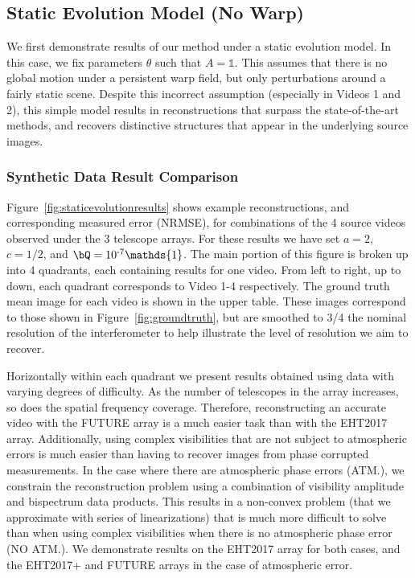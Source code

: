 \subsection{Static Evolution Model (No Warp)}
\label{sec:nomotionresults}

We first demonstrate results of our method under a static evolution model. In this case, we fix parameters $\theta$ such that $A=\mathds{1}$. This assumes that there is no global motion under a persistent warp field, but only perturbations around a fairly static scene. Despite this incorrect assumption (especially in Videos 1 and 2), this simple model results in reconstructions that surpass the state-of-the-art methods, and recovers distinctive structures that appear in the underlying source images. 


\subsubsection{Synthetic Data Result Comparison}



Figure~\ref{fig:staticevolutionresults} shows example reconstructions, and corresponding measured error (NRMSE), for combinations of the 4 source videos observed under the 3 telescope arrays. For these results we have set $a=2$, $c=1/2$, and $\bQ = 10^{\text{-}7} \mathds{1}$. The main portion of this figure is broken up into 4 quadrants, each containing results for one video. From left to right, up to down, each quadrant corresponds to Video 1-4 respectively. The ground truth mean image for each video is shown in the upper table. These images correspond to those shown in Figure~\ref{fig:groundtruth}, but are smoothed to 3/4 the nominal resolution of the interferometer to help illustrate the level of resolution we aim to recover. 

Horizontally within each quadrant we present results obtained using data with varying degrees of difficulty. As the number of telescopes in the array increases, so does the spatial frequency coverage. Therefore, reconstructing an accurate video with the FUTURE array is a much easier task than with the EHT2017 array.
Additionally, using complex visibilities that are not subject to atmospheric errors is much easier than having to recover images from phase corrupted measurements. 
In the case where there are atmospheric phase errors (ATM.), we constrain the reconstruction problem using a combination of visibility amplitude and bispectrum data products. This results in a non-convex problem (that we approximate with series of linearizations) that is much more difficult to solve than when using complex visibilities when there is no atmospheric phase error (NO ATM.). We demonstrate results on the EHT2017 array for both cases, and the EHT2017+ and FUTURE arrays in the case of atmospheric error. 




